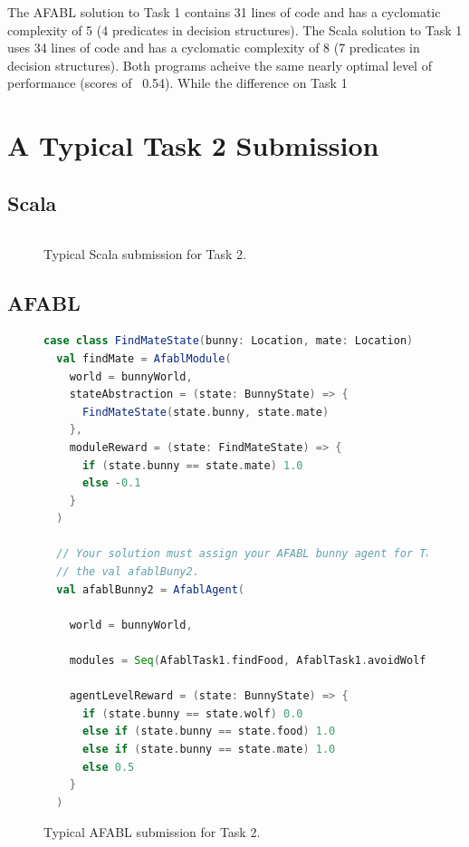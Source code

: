 The AFABL solution to Task 1 contains 31 lines of code and has a cyclomatic complexity of 5 (4 predicates in decision structures). The Scala solution to Task 1 uses 34 lines of code and has a cyclomatic complexity of 8 (7 predicates in decision structures). Both programs acheive the same nearly optimal level of performance (scores of ~0.54). While the difference on Task 1


\section{A Typical Task 2 Submission}

\subsection{Scala}

\begin{figure}[!h]
\begin{center}

\begin{lstlisting}[language=Scala]

\end{lstlisting}

\caption{Typical Scala submission for Task 2.}
\end{center}
\label{fig:scala-task2-submission}
\end{figure}


\subsection{AFABL}

\begin{figure}[!h]
\begin{center}

\begin{lstlisting}[language=Scala]
  case class FindMateState(bunny: Location, mate: Location)
  val findMate = AfablModule(
    world = bunnyWorld,
    stateAbstraction = (state: BunnyState) => {
      FindMateState(state.bunny, state.mate)
    },
    moduleReward = (state: FindMateState) => {
      if (state.bunny == state.mate) 1.0
      else -0.1
    }
  )

  // Your solution must assign your AFABL bunny agent for Task 2 to
  // the val afablBuny2.
  val afablBunny2 = AfablAgent(

    world = bunnyWorld,

    modules = Seq(AfablTask1.findFood, AfablTask1.avoidWolf, findMate),

    agentLevelReward = (state: BunnyState) => {
      if (state.bunny == state.wolf) 0.0
      else if (state.bunny == state.food) 1.0
      else if (state.bunny == state.mate) 1.0
      else 0.5
    }
  )
\end{lstlisting}

\caption{Typical AFABL submission for Task 2.}
\end{center}
\label{fig:afabl-task2-submission}
\end{figure}

